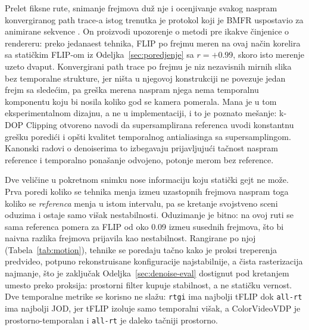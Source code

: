 Prelet fiksne rute, snimanje frejmova du\v{z} nje i ocenjivanje svakog naspram konvergiranog path trace-a
istog trenutka je protokol koji je BMFR uspostavio za animirane sekvence
\cite{koskela2019bmfr}. On proizvodi upozorenje o metodi pre ikakve \v{c}injenice o rendereru: preko
jedanaest tehnika, FLIP po frejmu meren na ovaj na\v{c}in korelira sa stati\v{c}kim FLIP-om iz
Odeljka~\ref{sec:poredjenje} sa $r = +0.99$, skoro isto merenje uzeto dvaput. Konvergirani
path trace po frejmu je niz nezavisnih mirnih slika bez temporalne strukture,
jer ni\v{s}ta u njegovoj konstrukciji ne povezuje jedan frejm sa slede\'cim, pa gre\v{s}ka merena naspram njega nema
temporalnu komponentu koju bi nosila koliko god se kamera pomerala. Mana je u tom eksperimentalnom dizajnu,
a ne u implementaciji, i to je poznato mešanje: k-DOP Clipping
\cite{ikkala2024kdop} otvoreno navodi da supersamplirana referenca uvodi konstantnu gre\v{s}ku
poredi\'ci i op\v{s}ti kvalitet temporalnog antialiasinga sa supersamplingom. Kanonski radovi o denoiserima
to izbegavaju prijavljuju\'ci ta\v{c}nost naspram reference i temporalno pona\v{s}anje odvojeno,
potonje merom bez reference.

Dve veli\v{c}ine u pokretnom snimku nose informaciju koju stati\v{c}ki gejt ne mo\v{z}e. Prva poredi
koliko se tehnika menja izme\dj{}u uzastopnih frejmova naspram toga koliko se \emph{referenca}
menja u istom intervalu, pa se kretanje svojstveno sceni oduzima i ostaje samo vi\v{s}ak
nestabilnosti. Oduzimanje je bitno: na ovoj ruti se sama referenca pomera za FLIP od oko
0.09 izme\dj{}u susednih frejmova, \v{s}to bi naivna razlika frejmova prijavila kao nestabilnost. Rangirane po
njoj (Tabela~\ref{tab:motion}), tehnike se poredaju ta\v{c}no kako je proksi treperenja predvideo,
potpuno rekonstruisane konfiguracije najstabilnije, a \v{c}ista rasterizacija najmanje, \v{s}to je
zaklju\v{c}ak Odeljka~\ref{sec:denoise-eval} dostignut pod kretanjem umesto preko proksija: prostorni
filter kupuje stabilnost, a ne stati\v{c}ku vernost. Dve temporalne metrike se korisno ne sla\v{z}u:
\texttt{rtgi} ima najbolji tFLIP dok \texttt{all-rt} ima najbolji JOD, jer tFLIP izoluje
samo temporalni vi\v{s}ak, a ColorVideoVDP je prostorno-temporalan i \texttt{all-rt} je daleko ta\v{c}niji
prostorno.

\begin{table}[tbp]
\caption[Stabilnost pod kretanjem po tehnici]{Stabilnost pod kretanjem, usrednjena preko \v{c}etiri
ta\v{c}ke sonde rute (RX 9070 XT), rangirano po FLIP-u. tFLIP meri koliko se tehnika menja izme\dj{}u
susednih frejmova preko onoga koliko se sama referenca menja, \v{s}to je konstrukcija tLP iz TecoGAN-a
\cite{chu2020tecogan} sa FLIP-om umesto LPIPS-a, a kašnjenje je pokretni frejm
naspram sopstvenog konvergiranog mirnog frejma u istoj pozi. JOD je ColorVideoVDP
\cite{mantiuk2024cvvdp}, jedina mera ovde koja direktno modeluje temporalnu osetljivost na kontrast.}
\label{tab:motion}
\centering

\end{table}

